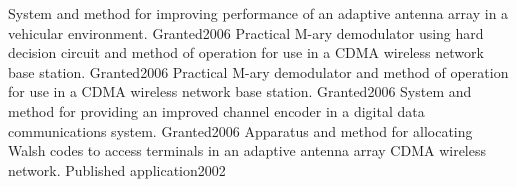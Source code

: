 
\begin{cvhonors}
    {System and method for improving performance of an adaptive antenna array in a vehicular environment.}
    {Granted}{2006}
    {Practical M-ary demodulator using hard decision circuit and method of operation for use in a CDMA wireless network base station.}
    {Granted}{2006}
    {Practical M-ary demodulator and method of operation for use in a CDMA wireless network base station.}
    {Granted}{2006}
    {System and method for providing an improved channel encoder in a digital data communications system.}
    {Granted}{2006}
    {Apparatus and method for allocating Walsh codes to access terminals in an adaptive antenna array CDMA wireless network.}
    {Published application}{2002}
\end{cvhonors}
